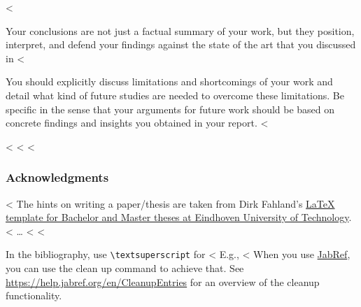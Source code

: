 \documentclass[runningheads,a4paper,english]{llncs}[2018/03/10]
\begin{document}
{%
<%

Your conclusions are not just a factual summary of your work, but they position, interpret, and defend your findings against the state of the art that you discussed in <%

You should explicitly discuss limitations and shortcomings of your work and detail what kind of future studies are needed to overcome these limitations. Be specific in the sense that your arguments for future work should be based on concrete findings and insights you obtained in your report. 
<%

<%
\label{sec:outlook}
\lipsum[1-2]
<%
<%

\subsubsection*{Acknowledgments}
<%
The hints on writing a paper/thesis are taken from Dirk Fahland's \href{https://github.com/dfahland/Master-or-Bachelor-thesis-Template-Eindhoven-University-of-Technology}{LaTeX template for Bachelor and Master theses at Eindhoven University of Technology}.
<%
\ldots
<%
<%


In the bibliography, use \texttt{\textbackslash textsuperscript} for <%
E.g., <%
When you use \href{https://www.jabref.org}{JabRef}, you can use the clean up command to achieve that.
See \url{https://help.jabref.org/en/CleanupEntries} for an overview of the cleanup functionality.

}
\end{document}
